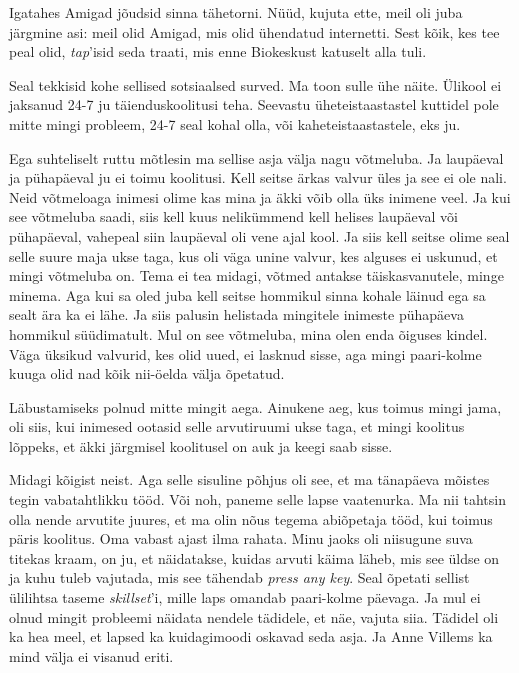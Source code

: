 Igatahes Amigad jõudsid sinna tähetorni. Nüüd, kujuta ette, 
meil oli juba järgmine asi: meil olid Amigad,  mis olid ühendatud  internetti. 
Sest kõik, kes  tee peal olid, \emph{tap}'isid seda traati, mis enne Biokeskust katuselt 
alla tuli. 


Seal tekkisid kohe sellised sotsiaalsed surved. Ma toon sulle ühe näite. 
Ülikool ei jaksanud 24-7 ju  täienduskoolitusi teha. Seevastu 
üheteistaastastel kuttidel pole mitte mingi probleem, 24-7 seal kohal olla, või 
kaheteistaastastele, eks ju. 

Ega suhteliselt ruttu mõtlesin ma sellise asja välja nagu võtmeluba. Ja 
laupäeval ja pühapäeval ju ei toimu koolitusi. Kell seitse ärkas 
valvur üles ja see ei ole nali. Neid võtmeloaga inimesi olime kas mina ja äkki 
võib olla üks inimene veel. Ja kui see võtmeluba saadi, siis kell kuus 
nelikümmend  kell helises laupäeval või pühapäeval, vahepeal siin laupäeval oli 
vene ajal kool. Ja siis kell seitse olime seal selle suure maja ukse taga, kus 
oli väga unine valvur, kes alguses ei uskunud, et mingi võtmeluba on.  
Tema ei tea midagi, võtmed antakse täiskasvanutele, minge minema. Aga kui 
sa oled juba kell seitse hommikul sinna kohale läinud ega sa sealt ära ka ei 
lähe. Ja siis palusin helistada mingitele inimeste pühapäeva hommikul 
süüdimatult. Mul on see võtmeluba, mina olen enda õiguses kindel. Väga 
üksikud valvurid, kes olid uued, ei lasknud sisse, aga mingi paari-kolme kuuga 
olid nad kõik nii-öelda välja õpetatud.


Läbustamiseks polnud mitte mingit aega. Ainukene aeg, kus toimus mingi jama, 
oli siis, kui inimesed ootasid selle arvutiruumi ukse taga, et mingi koolitus 
lõppeks, et äkki järgmisel koolitusel on auk ja keegi saab sisse. 


Midagi kõigist neist. Aga selle sisuline põhjus oli see, et ma tänapäeva 
mõistes tegin vabatahtlikku tööd. Või noh, paneme selle  lapse vaatenurka. Ma 
nii tahtsin olla nende arvutite juures, et ma olin nõus tegema abiõpetaja tööd, 
kui toimus päris koolitus. Oma vabast ajast ilma rahata. 
Minu jaoks oli niisugune suva titekas kraam, on ju, et  
näidatakse, kuidas  arvuti käima läheb, mis see üldse on ja kuhu tuleb 
vajutada, mis see tähendab \emph{press any key}. Seal õpetati sellist  
ülilihtsa taseme \emph{skillset}'i, mille laps omandab paari-kolme 
päevaga. Ja mul ei olnud mingit probleemi näidata nendele tädidele, et näe, 
vajuta siia. Tädidel oli ka hea meel, et lapsed ka kuidagimoodi  oskavad seda 
asja. Ja Anne Villems ka mind välja ei visanud eriti. 


